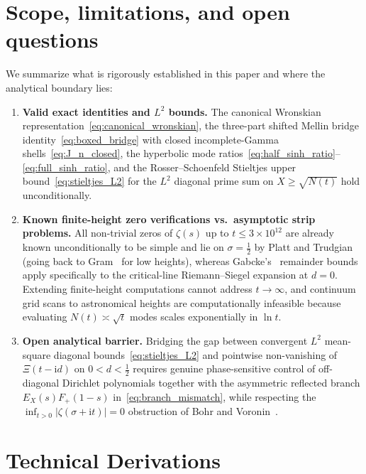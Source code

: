 \documentclass[11pt,reqno]{amsart}
\theoremstyle{plain}
\theoremstyle{definition}
\theoremstyle{remark}
\numberwithin{equation}{section}
\newcommand{\ii}{\mathrm{i}}
\begin{document}
\section{Scope, limitations, and open questions}\label{sec:scope}

We summarize what is rigorously established in this paper and where the analytical boundary lies:
\begin{enumerate}[label=\textup{(\arabic*)},leftmargin=2.2em]
\item \textbf{Valid exact identities and $L^2$ bounds.} The canonical Wronskian representation~\eqref{eq:canonical_wronskian}, the three-part shifted Mellin bridge identity~\eqref{eq:boxed_bridge} with closed incomplete-Gamma shells~\eqref{eq:J_n_closed}, the hyperbolic mode ratios~\eqref{eq:half_sinh_ratio}--\eqref{eq:full_sinh_ratio}, and the Rosser--Schoenfeld Stieltjes upper bound~\eqref{eq:stieltjes_L2} for the $L^2$ diagonal prime sum on $X \ge \sqrt{N(t)}$ hold unconditionally.
\item \textbf{Known finite-height zero verifications vs.\ asymptotic strip problems.} All non-trivial zeros of $\zeta(s)$ up to $t \le 3 \times 10^{12}$ are already known unconditionally to be simple and lie on $\sigma = \frac{1}{2}$ by Platt and Trudgian~\cite{platttrudgian2021} (going back to Gram~\cite{gram1903} for low heights), whereas Gabcke's~\cite{gabcke1979} remainder bounds apply specifically to the critical-line Riemann--Siegel expansion at $d = 0$. Extending finite-height computations cannot address $t \to \infty$, and continuum grid scans to astronomical heights are computationally infeasible because evaluating $N(t) \asymp \sqrt{t}$ modes scales exponentially in $\ln t$.
\item \textbf{Open analytical barrier.} Bridging the gap between convergent $L^2$ mean-square diagonal bounds~\eqref{eq:stieltjes_L2} and pointwise non-vanishing of $\Xi(t - \ii d)$ on $0 < d < \frac{1}{2}$ requires genuine phase-sensitive control of off-diagonal Dirichlet polynomials together with the asymmetric reflected branch $E_X(s)F_+(1 - s)$ in~\eqref{eq:branch_mismatch}, while respecting the $\inf_{t > 0}\lvert\zeta(\sigma + \ii t)\rvert = 0$ obstruction of Bohr and Voronin~\cite{bohrlandau1914,voronin1975}.
\end{enumerate}

\appendix

\section{Technical Derivations}\label{app:derivations}
\end{document}
